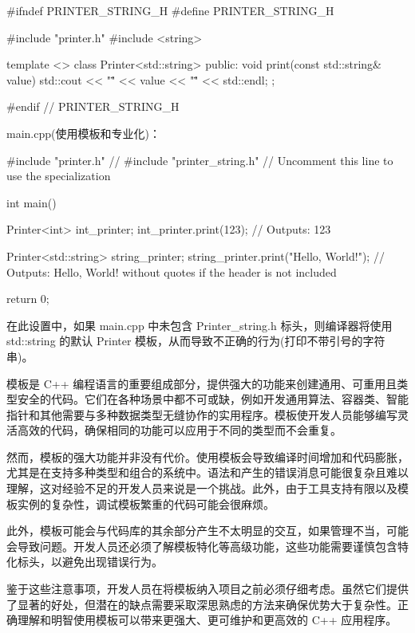\begin{cpp}
#ifndef PRINTER_STRING_H
#define PRINTER_STRING_H

#include "printer.h"
#include <string>

template <>
class Printer<std::string> {
    public:
    void print(const std::string& value) {
        std::cout << "\"" << value << "\"" << std::endl;
    }
};

#endif // PRINTER_STRING_H
\end{cpp}

main.cpp(使用模板和专业化)：

\begin{cpp}
#include "printer.h"
// #include "printer_string.h" // Uncomment this line to use the specialization

int main() {
    Printer<int> int_printer;
    int_printer.print(123); // Outputs: 123

    Printer<std::string> string_printer;
    string_printer.print("Hello, World!"); // Outputs: Hello, World! without quotes if the header is not included

    return 0;
}
\end{cpp}

在此设置中，如果 main.cpp 中未包含 Printer\_string.h 标头，则编译器将使用 std::string 的默认 Printer 模板，从而导致不正确的行为(打印不带引号的字符串)。

模板是 C++ 编程语言的重要组成部分，提供强大的功能来创建通用、可重用且类型安全的代码。它们在各种场景中都不可或缺，例如开发通用算法、容器类、智能指针和其他需要与多种数据类型无缝协作的实用程序。模板使开发人员能够编写灵活高效的代码，确保相同的功能可以应用于不同的类型而不会重复。

然而，模板的强大功能并非没有代价。使用模板会导致编译时间增加和代码膨胀，尤其是在支持多种类型和组合的系统中。语法和产生的错误消息可能很复杂且难以理解，这对经验不足的开发人员来说是一个挑战。此外，由于工具支持有限以及模板实例的复杂性，调试模板繁重的代码可能会很麻烦。

此外，模板可能会与代码库的其余部分产生不太明显的交互，如果管理不当，可能会导致问题。开发人员还必须了解模板特化等高级功能，这些功能需要谨慎包含特化标头，以避免出现错误行为。

鉴于这些注意事项，开发人员在将模板纳入项目之前必须仔细考虑。虽然它们提供了显著的好处，但潜在的缺点需要采取深思熟虑的方法来确保优势大于复杂性。正确理解和明智使用模板可以带来更强大、更可维护和更高效的 C++ 应用程序。
















